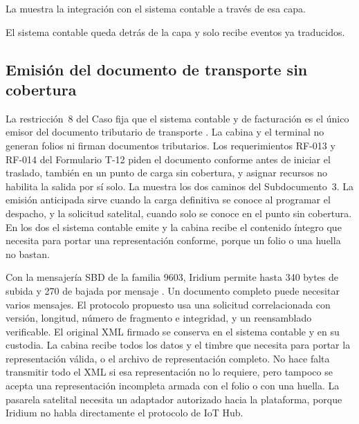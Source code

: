 La  muestra la integración con el sistema contable a través de esa capa.


El sistema contable queda detrás de la capa y solo recibe eventos ya traducidos.

\subsection{Emisión del documento de transporte sin cobertura}\label{sec:4-documento}

La restricción~8 del Caso fija que el sistema contable y de facturación es el único emisor del
documento tributario de transporte . La cabina y el terminal no generan folios
ni firman documentos tributarios. Los requerimientos RF-013 y RF-014 del Formulario T-12 piden el
documento conforme antes de iniciar el traslado, también en un punto de carga sin cobertura, y asignar
recursos no habilita la salida por sí solo. La  muestra los dos caminos del
Subdocumento~3. La emisión anticipada sirve cuando la carga definitiva se conoce al programar el
despacho, y la solicitud satelital, cuando solo se conoce en el punto sin cobertura. En los dos el
sistema contable emite y la cabina recibe el contenido íntegro que necesita para portar una
representación conforme, porque un folio o una huella no bastan.


Con la mensajería SBD de la familia 9603, Iridium permite hasta 340 bytes de subida y 270 de bajada por
mensaje \parencite{iridium_9603}. Un documento completo puede necesitar varios mensajes. El protocolo propuesto usa una solicitud correlacionada con versión, longitud, número de
fragmento e integridad, y un reensamblado verificable. El original XML firmado se conserva en el
sistema contable y en su custodia. La cabina recibe todos los datos y el timbre que necesita para
portar la representación válida, o el archivo de representación completo. No hace falta transmitir todo
el XML si esa representación no lo requiere, pero tampoco se acepta una representación incompleta armada
con el folio o con una huella. La pasarela satelital necesita un adaptador autorizado hacia la
plataforma, porque Iridium no habla directamente el protocolo de IoT Hub.

